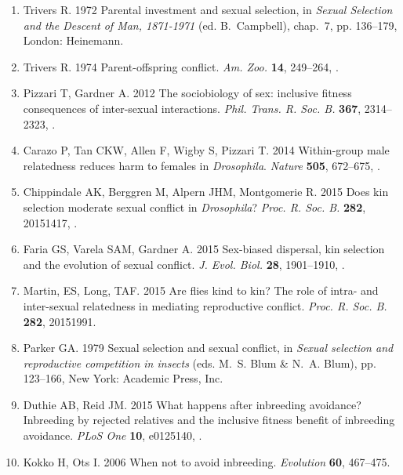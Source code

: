 \documentclass[12pt]{article}
\begin{document}
\begin{enumerate}
\item{Trivers R. 1972 {Parental investment and sexual selection}, in \textit{Sexual
  Selection and the Descent of Man, 1871-1971} (ed. B.~Campbell), chap.~7, pp.
  136--179, London: Heinemann.}

\item{Trivers R. 1974 {Parent-offspring conflict}. \textit{Am. Zoo.}
  \textbf{14}, 249--264, .}

\item{Pizzari T, Gardner A. 2012 {The sociobiology of sex: inclusive fitness
  consequences of inter-sexual interactions}. 
  \textit{Phil. Trans. R. Soc. B.} \textbf{367}, 2314--2323,
  .}

\item{Carazo P, Tan CKW, Allen F, Wigby S, Pizzari T. 2014
  {Within-group male relatedness reduces harm to females in \textit{Drosophila}}.
  \textit{Nature} \textbf{505}, 672--675, .}

\item{Chippindale AK, Berggren M, Alpern JHM, Montgomerie R. 2015
  {Does kin selection moderate sexual conflict in \textit{Drosophila}?}
  \textit{Proc. R. Soc. B.} \textbf{282}, 20151417,
  .}

\item{Faria GS, Varela SAM, Gardner A. 2015 {Sex-biased dispersal, kin
  selection and the evolution of sexual conflict}. \textit{J.
  Evol. Biol.} \textbf{28}, 1901--1910, .}

\item{Martin, ES, Long, TAF. 2015 {Are flies kind to kin? The role of
  intra- and inter-sexual relatedness in mediating reproductive conflict}.
  \textit{Proc. R. Soc. B.} \textbf{282}, 20151991.}

\item{Parker GA. 1979 {Sexual selection and sexual conflict}, in \textit{Sexual
  selection and reproductive competition in insects} (eds. M.~S. Blum \& N.~A.
  Blum), pp. 123--166, New York: Academic Press, Inc.}

\item{Duthie AB, Reid JM. 2015 {What happens after inbreeding avoidance?
  Inbreeding by rejected relatives and the inclusive fitness benefit of
  inbreeding avoidance}. \textit{PLoS One} \textbf{10}, e0125140,
  .}

\item{Kokko H, Ots I. 2006 {When not to avoid inbreeding}. \textit{Evolution}
  \textbf{60}, 467--475.}


\end{enumerate}
\end{document}
